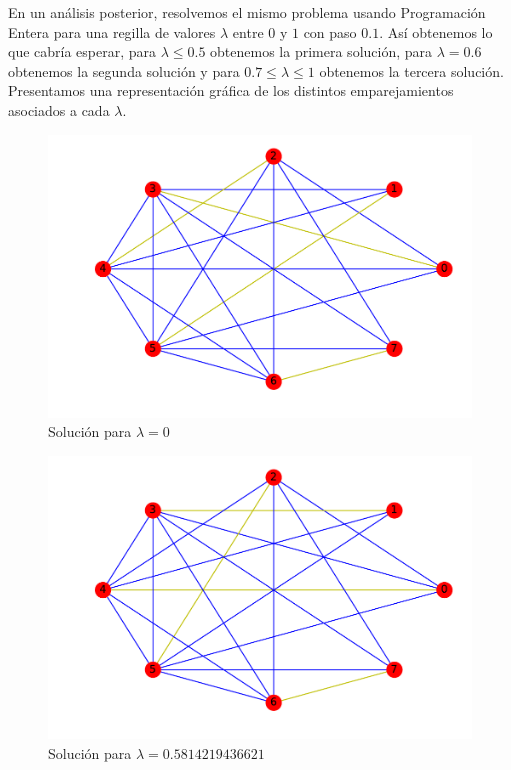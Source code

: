 \documentclass[twoside,a4paper,openright,12pt]{book}
\begin{document}
En un análisis posterior, resolvemos el mismo problema usando Programación Entera para una regilla de valores $\lambda$ entre $0$ y $1$ con paso $0.1$. Así obtenemos lo que cabría esperar, para $\lambda \leq 0.5$ obtenemos la primera solución, para $\lambda = 0.6$ obtenemos la segunda solución y para $0.7 \leq \lambda \leq 1$ obtenemos la tercera solución. Presentamos una representación gráfica de los distintos emparejamientos asociados a cada $\lambda$. 
\begin{figure}[h!]
\centering
\includegraphics[scale=0.5]{opt2}
\caption{Solución para $\lambda=0$}
\end{figure}


\begin{figure}[h!]
\centering
\includegraphics[scale=0.5]{opt3}
\caption{Solución para $\lambda=0.5814219436621$}
\end{figure}
\end{document}
